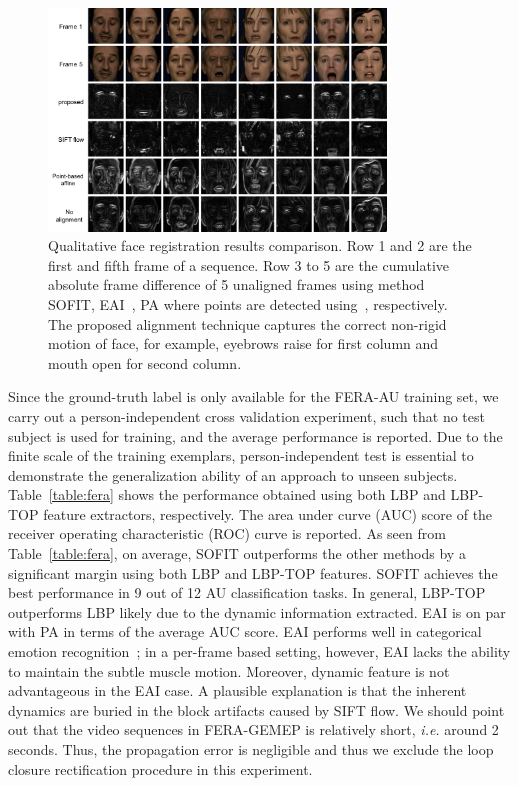 \documentclass[10pt,journal]{IEEEtran}
\begin{document}
\begin{figure}[t]
	\centering
		\includegraphics[width=0.8\textwidth]{fig/fera_diff.png}
	\caption{Qualitative face registration results comparison. Row 1 and 2 are the first and fifth frame of a sequence. Row 3 to 5 are the cumulative absolute frame difference of 5 unaligned frames using method SOFIT, EAI~\cite{Yang_SMCB12}, PA where points are detected using~\cite{Tadas_ECCV14}, respectively. The proposed alignment technique captures the correct non-rigid motion of face, for example, eyebrows raise for first column and mouth open for second column.}
	\label{fig:fera_diff}
\end{figure}


Since the ground-truth label is only available for the FERA-AU training set, we carry out a person-independent cross validation experiment, such that no test subject is used for training, and the average performance is reported. Due to the finite scale of the training exemplars, person-independent test is essential to demonstrate the generalization ability of an approach to unseen subjects. Table~\ref{table:fera} shows the performance obtained using both LBP and LBP-TOP feature extractors, respectively. The area under curve (AUC) score of the receiver operating characteristic (ROC) curve is reported. As seen from Table~\ref{table:fera}, on average, SOFIT outperforms the other methods by a significant margin using both LBP and LBP-TOP features. SOFIT achieves the best performance in 9 out of 12 AU classification tasks. In general, LBP-TOP outperforms LBP likely due to the dynamic information extracted. EAI is on par with PA in terms of the average AUC score. EAI performs well in categorical emotion recognition~\cite{Yang_SMCB12}; in a per-frame based setting, however, EAI lacks the ability to maintain the subtle muscle motion. Moreover, dynamic feature is not advantageous in the EAI case. A plausible explanation is that the inherent dynamics are buried in the block artifacts caused by SIFT flow. We should point out that the video sequences in FERA-GEMEP is relatively short, \textit{i.e.} around 2 seconds. Thus, the propagation error is negligible and thus we exclude the loop closure rectification procedure in this experiment. 
\end{document}
